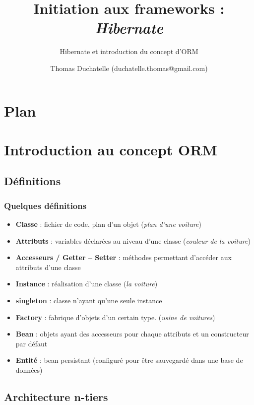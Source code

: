 \documentclass[compress]{beamer}%
\title{Initiation aux frameworks : \emph{Hibernate}}
\subtitle{Hibernate et introduction du concept d'ORM}
\author{Thomas Duchatelle (duchatelle.thomas@gmail.com)}
\institute{Capgemini, pour Yves Rocher}
\begin{document}
\frame{\titlepage}
  
\section*{Plan}
\frame{\tableofcontents[hideallsubsections]}
	
\section{Introduction au concept ORM}
	
\subsection{Définitions}
		
\begin{frame}
	\frametitle{Quelques définitions}
	\begin{itemize}[<+->]
	\item \textbf{Classe} : fichier de code, plan d'un objet (\emph{plan d'une voiture})
	\item \textbf{Attributs} : variables déclarées au niveau d'une classe (\emph{couleur de la voiture})
	\item \textbf{Accesseurs / Getter -- Setter} : méthodes permettant d'accéder aux attributs d'une classe
	\item \textbf{Instance} : réalisation d'une classe (\emph{la voiture})
	\item \textbf{singleton} : classe n'ayant qu'une seule instance
	\item \textbf{Factory} : fabrique d'objets d'un certain type. (\emph{usine de voitures}) %
	\item \textbf{Bean} : objets ayant des accesseurs pour chaque attributs et un constructeur par défaut
	\item \textbf{Entité} : bean persistant (configuré pour être sauvegardé dans une base de données)
	\end{itemize}
\end{frame}
	
\subsection{Architecture n-tiers}
\end{document}
